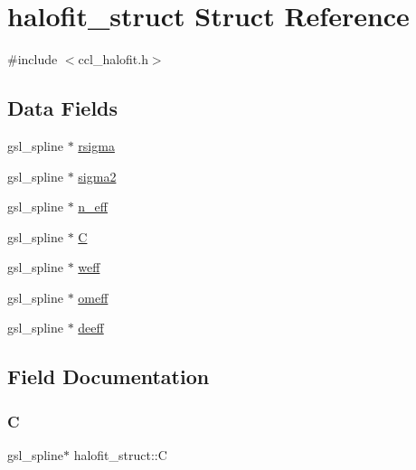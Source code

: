 \hypertarget{structhalofit__struct}{}\section{halofit\+\_\+struct Struct Reference}
\label{structhalofit__struct}


{\ttfamily \#include $<$ccl\+\_\+halofit.\+h$>$}

\subsection*{Data Fields}
\begin{DoxyCompactItemize}
\item 
gsl\+\_\+spline $\ast$ \mbox{\hyperlink{structhalofit__struct_a852ec26280251fa97ba2a32fb717ac44}{rsigma}}
\item 
gsl\+\_\+spline $\ast$ \mbox{\hyperlink{structhalofit__struct_a4dd097d7511013393f6a93b8689442ef}{sigma2}}
\item 
gsl\+\_\+spline $\ast$ \mbox{\hyperlink{structhalofit__struct_a8634d18f71fe143fa423ed0e007cce0c}{n\+\_\+eff}}
\item 
gsl\+\_\+spline $\ast$ \mbox{\hyperlink{structhalofit__struct_a54cc5795dbda48ba099dcf026ed27894}{C}}
\item 
gsl\+\_\+spline $\ast$ \mbox{\hyperlink{structhalofit__struct_ab9795d46477327605470d72b589aa162}{weff}}
\item 
gsl\+\_\+spline $\ast$ \mbox{\hyperlink{structhalofit__struct_afc4f08ff679b1c6ae7d5375391b20773}{omeff}}
\item 
gsl\+\_\+spline $\ast$ \mbox{\hyperlink{structhalofit__struct_a9c4b15ef8c85529c4a46ffdff4922df8}{deeff}}
\end{DoxyCompactItemize}


\subsection{Field Documentation}
\mbox{\label{structhalofit__struct_a54cc5795dbda48ba099dcf026ed27894}} 
\subsubsection{\texorpdfstring{C}{C}}
{\footnotesize\ttfamily gsl\+\_\+spline$\ast$ halofit\+\_\+struct\+::C}

